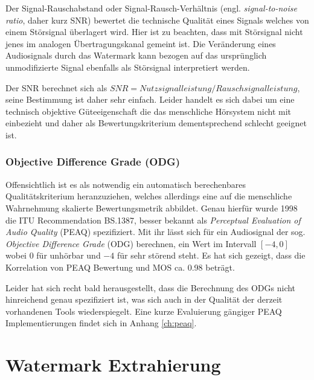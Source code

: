 Der Signal-Rauschabstand oder Signal-Rausch-Verhältnis (engl. \textit{signal-to-noise ratio}, daher kurz SNR) bewertet die technische Qualität eines Signals welches von einem Störsignal überlagert wird. Hier ist zu beachten, dass mit Störsignal nicht jenes im analogen Übertragungskanal gemeint ist. Die Veränderung eines Audiosignals durch das Watermark kann bezogen auf das ursprünglich unmodifizierte Signal ebenfalls als Störsignal interpretiert werden. 

Der SNR berechnet sich als $SNR = Nutzsignalleistung / Rauschsignalleistung$, seine Bestimmung ist daher sehr einfach. Leider handelt es sich dabei um eine technisch objektive Güteeigenschaft die das menschliche Hörsystem nicht mit einbezieht und daher als Bewertungskriterium dementsprechend schlecht geeignet ist\cite{xiang2007robust}.

\subsubsection{Objective Difference Grade (ODG)} 

Offensichtlich ist es als notwendig ein automatisch berechenbares Qualitätskriterium heranzuziehen, welches allerdings eine auf die menschliche Wahrnehmung skalierte Bewertungsmetrik abbildet. Genau hierfür wurde 1998 die ITU Recommendation BS.1387\cite{rec1998bs}, besser bekannt als \textit{Perceptual Evaluation of Audio Quality} (PEAQ) spezifiziert. Mit ihr lässt sich für ein Audiosignal der sog. \textit{Objective Difference Grade} (ODG) berechnen, ein Wert im Intervall $[-4,0]$ wobei $0$ für  \glqq{}unhörbar\grqq{} und $-4$ für \glqq{}sehr störend\grqq{} steht. Es hat sich gezeigt, dass die Korrelation von PEAQ Bewertung und MOS ca. 0.98 beträgt\cite{al2011dwt}.

Leider hat sich recht bald herausgestellt, dass die Berechnung des ODGs nicht hinreichend genau spezifiziert ist\cite{kabal2002examination}\cite{campeanu2005peaq}, was sich auch in der Qualität der derzeit vorhandenen Tools wiederspiegelt. Eine kurze Evaluierung gängiger PEAQ Implementierungen findet sich in Anhang \ref{ch:peaq}.


\section{Watermark Extrahierung}
\label{sec:extraction}

